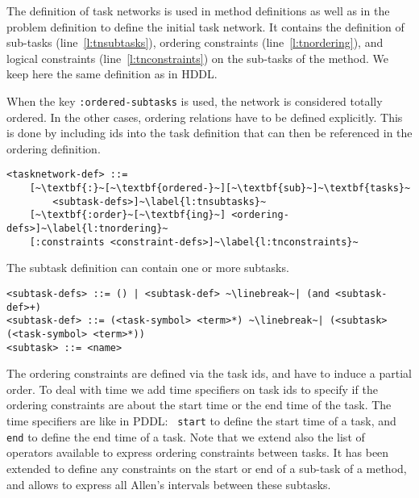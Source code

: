 \documentclass[letterpaper]{article} %
\begin{document}
%
%
The definition of task networks is used in method definitions as well as in the problem definition to define the initial task network. It contains the definition of sub-tasks (line~\ref{l:tnsubtasks}), ordering constraints (line~\ref{l:tnordering}), and logical constraints (line~\ref{l:tnconstraints}) on the sub-tasks of the method. We keep here the same definition as in HDDL.

When the key \verb+:ordered-subtasks+ is used, the network is considered totally ordered. In the other cases, ordering relations have to be defined explicitly. This is done by including ids into the task definition that can then be referenced in the ordering definition.

\begin{lstlisting}[firstnumber=last, escapechar=~]
<tasknetwork-def> ::=
    [~\textbf{:}~[~\textbf{ordered-}~][~\textbf{sub}~]~\textbf{tasks}~
        <subtask-defs>]~\label{l:tnsubtasks}~
    [~\textbf{:order}~[~\textbf{ing}~] <ordering-defs>]~\label{l:tnordering}~
    [:constraints <constraint-defs>]~\label{l:tnconstraints}~
\end{lstlisting}

%
%
\noindent The subtask definition can contain one or more subtasks.

\begin{lstlisting}[firstnumber=last, escapechar=~]
<subtask-defs> ::= () | <subtask-def> ~\linebreak~| (and <subtask-def>+)
<subtask-def> ::= (<task-symbol> <term>*) ~\linebreak~| (<subtask> (<task-symbol> <term>*))
<subtask> ::= <name>
\end{lstlisting}

%
%
The ordering constraints are defined via the task ids, and have to induce a partial order. To deal with time we add time specifiers on task ids to specify if the ordering constraints are about the start time or the end time of the task. The time specifiers are like in PDDL: ~{\tt start} to define the start time of a task, and {\tt end}  to define the end time of a task. Note that we extend also the list of operators available to express ordering constraints between tasks. It has been extended to define any constraints on the start or end of a sub-task of a method, and allows to express all Allen's intervals \citep{allen81} between these subtasks.
\end{document}
